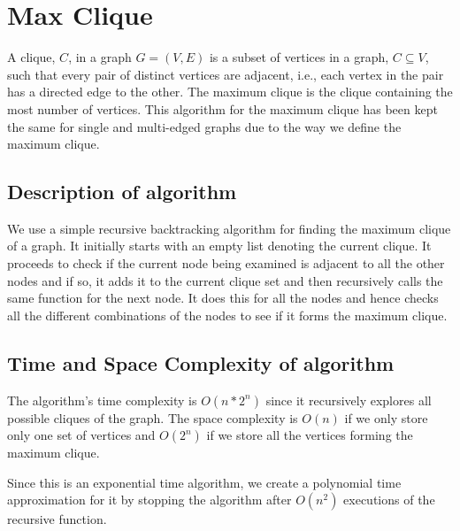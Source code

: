\section{Max Clique}
A clique, \(C\), in a graph \(G = (V, E)\) is a subset of vertices in a graph, \(C \subseteq V\), such that every pair of distinct vertices are adjacent, i.e., each vertex in the pair has a directed edge to the other. The maximum clique is the clique containing the most number of vertices. This algorithm for the maximum clique has been kept the same for single and multi-edged graphs due to the way we define the maximum clique.
\subsection{Description of algorithm}
We use a simple recursive backtracking algorithm for finding the maximum clique of a graph. It initially starts with an empty list denoting the current clique. It proceeds to check if the current node being examined is adjacent to all the other nodes and if so, it adds it to the current clique set and then recursively calls the same function for the next node. It does this for all the nodes and hence checks all the different combinations of the nodes to see if it forms the maximum clique.
\subsection{Time and Space Complexity of algorithm}
The algorithm's time complexity is $O(n*2^n)$ since it recursively explores all possible cliques of the graph. The space complexity is $O(n)$ if we only store only one set of vertices and $O(2^n)$ if we store all the vertices forming the maximum clique.

Since this is an exponential time algorithm, we create a polynomial time approximation for it by stopping the algorithm after $O(n^2)$ executions of the recursive function.

\newpage


